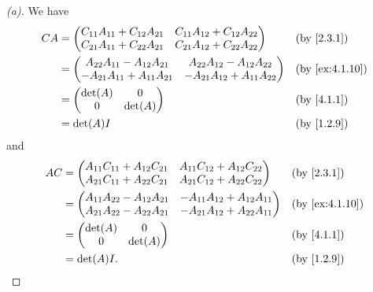 \begin{proof}[(a)]
  We have
  \begin{align*}
    CA & = \begin{pmatrix}
             C_{1 1} A_{1 1} + C_{1 2} A_{2 1} & C_{1 1} A_{1 2} + C_{1 2} A_{2 2} \\
             C_{2 1} A_{1 1} + C_{2 2} A_{2 1} & C_{2 1} A_{1 2} + C_{2 2} A_{2 2}
           \end{pmatrix}   &  & \text{(by \cref{2.3.1})}                                  \\
       & = \begin{pmatrix}
             A_{2 2} A_{1 1} - A_{1 2} A_{2 1}  & A_{2 2} A_{1 2} - A_{1 2} A_{2 2}  \\
             -A_{2 1} A_{1 1} + A_{1 1} A_{2 1} & -A_{2 1} A_{1 2} + A_{1 1} A_{2 2}
           \end{pmatrix} &  & \text{(by \cref{ex:4.1.10})}                                \\
       & = \begin{pmatrix}
             \det(A) & 0       \\
             0       & \det(A)
           \end{pmatrix}                                                       &  & \text{(by \cref{4.1.1})}      \\
       & = \det(A) I                                                                &  & \text{(by \cref{1.2.9})}
  \end{align*}
  and
  \begin{align*}
    AC & = \begin{pmatrix}
             A_{1 1} C_{1 1} + A_{1 2} C_{2 1} & A_{1 1} C_{1 2} + A_{1 2} C_{2 2} \\
             A_{2 1} C_{1 1} + A_{2 2} C_{2 1} & A_{2 1} C_{1 2} + A_{2 2} C_{2 2}
           \end{pmatrix}  &  & \text{(by \cref{2.3.1})}                                 \\
       & = \begin{pmatrix}
             A_{1 1} A_{2 2} - A_{1 2} A_{2 1} & -A_{1 1} A_{1 2} + A_{1 2} A_{1 1} \\
             A_{2 1} A_{2 2} - A_{2 2} A_{2 1} & -A_{2 1} A_{1 2} + A_{2 2} A_{1 1}
           \end{pmatrix} &  & \text{(by \cref{ex:4.1.10})}                                \\
       & = \begin{pmatrix}
             \det(A) & 0       \\
             0       & \det(A)
           \end{pmatrix}                                                      &  & \text{(by \cref{4.1.1})}      \\
       & = \det(A) I.                                                              &  & \text{(by \cref{1.2.9})}
  \end{align*}
\end{proof}

